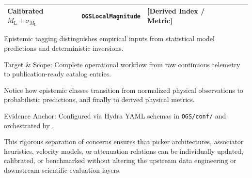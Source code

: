 \begin{landscape}
\begin{table}[htbp]
\begin{threeparttable}
\begin{tabularx}{\linewidth}{l l l l >{\raggedright\arraybackslash}X}
        Calibrated $M_{\mathrm{L}} \pm \sigma_{M_{\mathrm{L}}}$ &
        \texttt{OGSLocalMagnitude}
        & [Derived Index / Metric] \\
        \bottomrule
      \end{tabularx}
      \begin{tablenotes}[flushleft]
        \footnotesize
      \item[a] Epistemic tagging distinguishes empirical inputs from
        statistical model predictions and deterministic inversions.
      \item Target \& Scope: Complete operational workflow from raw
        continuous telemetry to publication-ready catalog entries.
      \item Notice how epistemic classes transition from normalized
        physical observations to probabilistic predictions, and
        finally to derived physical metrics.
      \item Evidence Anchor: Configured via Hydra YAML schemas in
        \texttt{OGS/conf/} and orchestrated by .
      \end{tablenotes}
    \end{threeparttable}
  \end{table}
\end{landscape}

This rigorous separation of concerns ensures that picker
architectures, associator heuristics, velocity models, or
attenuation relations can be individually updated, calibrated, or
benchmarked without altering the upstream data engineering or
downstream scientific evaluation layers.
